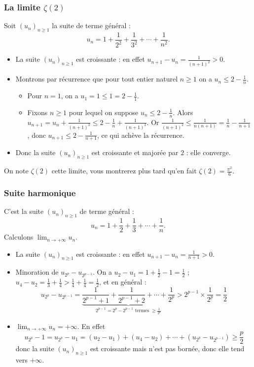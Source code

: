 \documentclass[class=report,crop=false]{standalone}
\begin{document}
\subsubsection{La limite $\zeta(2)$}
\label{ssub:zeta}

Soit $(u_n)_{n\geq 1}$ la suite de terme général :
\[ u_n =1+\frac{1}{2^2} +\frac{1}{3^2}+\cdots+\frac{1}{n^2} .\]

\begin{itemize}
  \item  La suite $(u_n)_{n\geq 1}$ est croissante : en effet $u_{n+1}-u_n= \frac{1}{(n+1)^2}>0$.
  \item Montrons par récurrence que pour tout entier naturel $n\geq 1$ on a $u_n\leq 2 - \frac{1}{n} $.
  \begin{itemize}
  \item Pour $n=1$, on a $u_1=1\leq 1=2 - \frac{1}{1}$.
  \item Fixons $n\geq 1$ pour lequel on suppose $u_n\leq 2 - \frac{1}{n}$.
Alors $u_{n+1}=u_n+ \frac{1}{(n+1)^2}\leq  2 - \frac{1}{n}+ \frac{1}{(n+1)^2}$.
Or $\frac{1}{(n+1)^2}\leq \frac{1}{n(n+1)}=\frac{1}{n}-\frac{1}{n+1}$, donc $u_{n+1}\leq 2-\frac{1}{n+1}$, ce qui achève la récurrence.
\end{itemize}
\item Donc la suite $(u_n)_{n\geq 1}$ est croissante et majorée par $2$ : elle converge.
\end{itemize}

On note $\zeta(2)$ cette limite, vous montrerez plus tard qu'en fait $\zeta(2)=\frac{\pi^2}{6}$.



\subsubsection{Suite harmonique}

C'est la suite $(u_n)_{n\geq 1}$ de terme général :
\[ u_n =1+\frac{1}{2} +\frac{1}{3}+\cdots+\frac{1}{n} .\]
Calculons $\lim_{n\to +\infty} u_n$.

\begin{itemize}
  \item La suite $(u_n)_{n\geq 1}$ est croissante : en effet $u_{n+1}-u_n= \frac{1}{n+1}>0$.
  \item Minoration de $u_{2^p}-u_{2^{p-1}}$. On a
$u_2-u_1=1+\frac{1}{2}-1=\frac{1}{2}$ ; $u_4-u_2=\frac{1}{3}+\frac{1}{4}> \frac{1}{4}+\frac{1}{4}=\frac{1}{2}$, et en général :
    \[ u_{2^p}-u_{2^{p-1}}=\underbrace{\frac{1}{2^{p-1}+1}+ \frac{1}{2^{p-1}+2}+\cdots+\frac{1}{2^p}}_{2^{p-1}=2^p-2^{p-1}
\textrm{ termes }\geq \frac{1}{2^p}}> 2^{p-1}\times \frac{1}{2^p}=\frac{1}{2}\]
  \item  $\lim_{n\to +\infty} u_n=+\infty$. En effet
    \[  u_{2^p}-1 = u_{2^p}-u_1= (u_2 - u_1)+ (u_4 - u_2)+ \cdots +  (u_{2^p}-u_{2^{p-1}}) \geq \frac{p}{2} \]
donc la suite  $(u_n)_{n\geq 1}$ est croissante mais n'est pas bornée, donc elle tend vers $+\infty$.

\end{itemize}
\end{document}
